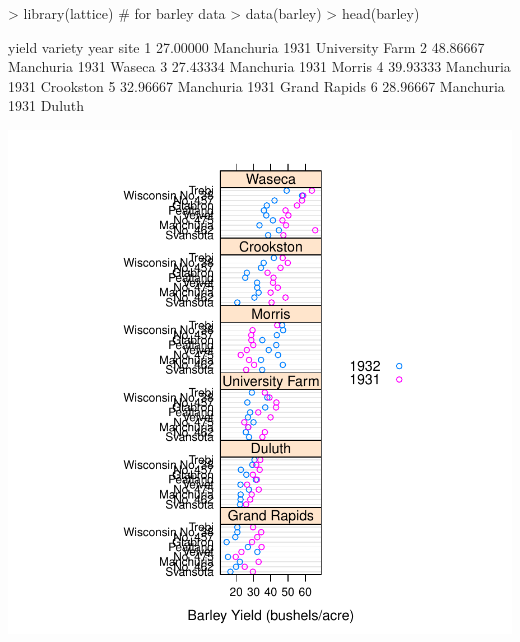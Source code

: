 \begin{Schunk}
\begin{Sinput}
> library(lattice)  # for barley data
> data(barley)
> head(barley)
\end{Sinput}
\begin{Soutput}
     yield   variety year            site
1 27.00000 Manchuria 1931 University Farm
2 48.86667 Manchuria 1931          Waseca
3 27.43334 Manchuria 1931          Morris
4 39.93333 Manchuria 1931       Crookston
5 32.96667 Manchuria 1931    Grand Rapids
6 28.96667 Manchuria 1931          Duluth
\end{Soutput}
\end{Schunk}
\includegraphics{lect_chapter5_v2-025}

